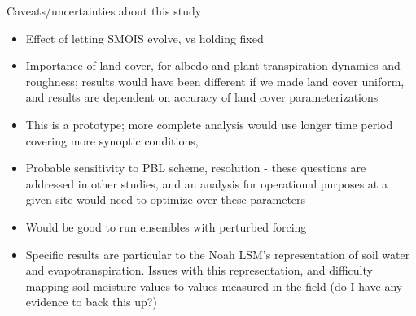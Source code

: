 Caveats/uncertainties about this study
\begin{itemize}
\item Effect of letting SMOIS evolve, vs holding fixed
\item Importance of land cover, for albedo and plant transpiration dynamics and roughness; results would have been different if we made land cover uniform, and results are dependent on accuracy of land cover parameterizations
\item This is a prototype; more complete analysis would use longer time period covering more synoptic conditions, 
\item Probable sensitivity to PBL scheme, resolution - these questions are addressed in other studies, and an analysis for operational purposes at a given site would need to optimize over these parameters
\item Would be good to run ensembles with perturbed forcing
\item Specific results are particular to the Noah LSM's representation of soil water and evapotranspiration.  Issues with this representation, and difficulty mapping soil moisture values to values measured in the field (do I have any evidence to back this up?)
\end{itemize}

%